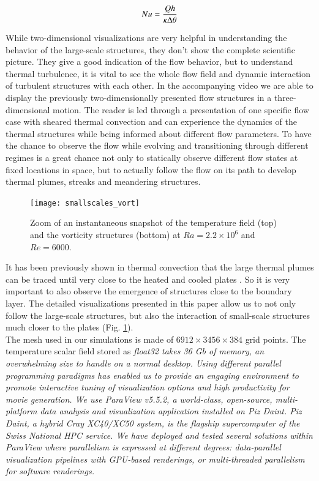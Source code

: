 \documentclass[final,5p,times,twocolumn]{elsarticle}
\begin{document}
\begin{equation} %
Nu= \frac{Qh}{\kappa \Delta \theta}
\label{eqn:nusselt} \\[8pt]
\end{equation} 

While two-dimensional visualizations are very helpful in understanding the behavior of the large-scale structures, they don't show the complete scientific picture. They give a good indication of the flow behavior, but to understand thermal turbulence, it is vital to see the whole flow field and dynamic interaction of turbulent structures with each other.
In the accompanying video we are able to display the previously two-dimensionally presented flow structures in a three-dimensional motion. The reader is led through a presentation of one specific flow case with sheared thermal convection and can experience the dynamics of the thermal structures while being informed about different flow parameters. To have the chance to observe the flow while evolving and transitioning through different regimes is a great chance not only to statically observe different flow states at fixed locations in space, but to actually follow the flow on its path to develop thermal plumes, streaks and meandering structures.


\begin{figure}
	\centering
	\texttt{[image: smallscales\_vort]}%
	\caption{\label{fig:smallscale} Zoom of an instantaneous snapshot of the temperature field (top) and the vorticity structures (bottom) at $ Ra=2.2 \times 10^6 $ and $ Re=6000 $.}
\end{figure}

It has been previously shown in thermal convection that the large thermal plumes can be traced until very close to the heated and cooled plates \cite{ste18}. So it is very important to also observe the emergence of structures close to the boundary layer. The detailed visualizations presented in this paper allow us to not only follow the large-scale structures, but also the interaction of small-scale structures much closer to the plates (Fig. \ref{fig:smallscale}).\\

The mesh used in our simulations is made of $ 6912 \times 3456 \times 384 $ grid points.
The temperature scalar field stored as \it{float32} \rm takes 36 Gb of memory, an
overwhelming size to handle on a normal desktop. Using different parallel programming
paradigms has enabled us to provide an engaging environment
to promote interactive tuning of visualization options and high productivity for movie
generation. We use ParaView v5.5.2, a world-class, open-source, multi-platform data analysis and
visualization application installed on Piz Daint. Piz Daint, a hybrid Cray XC40/XC50 system,
is the flagship supercomputer of the Swiss National HPC service. We have deployed
and tested several solutions within ParaView where parallelism is expressed
at different degrees: data-parallel visualization pipelines with GPU-based renderings,
or multi-threaded parallelism for software renderings.
\end{document}
